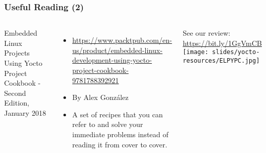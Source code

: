 \begin{frame}
  \frametitle{Useful Reading (2)}
  \begin{columns}
    Embedded Linux Projects Using Yocto Project Cookbook - Second Edition, January 2018
    \begin{itemize}
    \item \url{https://www.packtpub.com/en-us/product/embedded-linux-development-using-yocto-project-cookbook-9781788392921}
    \item By Alex González
    \item A set of recipes that you can refer to and solve your
          immediate problems instead of reading it from cover to cover. 
    \end{itemize}
    See our review: \url{https://bit.ly/1GgVmCB}
    \texttt{[image: slides/yocto-resources/ELPYPC.jpg]}
  \end{columns}
\end{frame}
